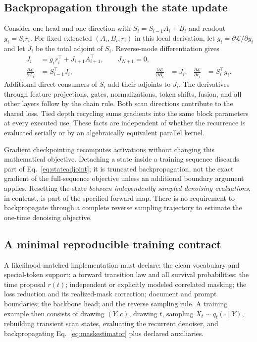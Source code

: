 \documentclass{article}
\theoremstyle{remark}\newtheorem{remark}[theorem]{Remark}
\begin{document}
\subsection{Backpropagation through the state update}
Consider one head and one direction with
$S_i=S_{i-1}A_i+B_i$ and readout $y_i=S_ir_i$.
For fixed extracted $(A_i,B_i,r_i)$ in this local derivation, let $g_i=\partial\mathcal L/\partial y_i$ and let $J_i$ be the total adjoint of $S_i$. Reverse-mode differentiation gives
\begin{align}
 J_i&=g_ir_i^\top+J_{i+1}A_{i+1}^\top,\qquad J_{N+1}=0,\\
 \frac{\partial\mathcal L}{\partial A_i}&=S_{i-1}^\top J_i,
 &\frac{\partial\mathcal L}{\partial B_i}&=J_i,
 &\frac{\partial\mathcal L}{\partial r_i}&=S_i^\top g_i.
 \label{eq:stateadjoint}
\end{align}
Additional direct consumers of $S_i$ add their adjoints to $J_i$. The derivatives through feature projections, gates, normalizations, token shifts, fusion, and all other layers follow by the chain rule. Both scan directions contribute to the shared loss. Tied depth recycling sums gradients into the same block parameters at every executed use. These facts are independent of whether the recurrence is evaluated serially or by an algebraically equivalent parallel kernel.

Gradient checkpointing recomputes activations without changing this mathematical objective. Detaching a state inside a training sequence discards part of Eq.~\eqref{eq:stateadjoint}; it is truncated backpropagation, not the exact gradient of the full-sequence objective unless an additional boundary argument applies. Resetting the state \emph{between independently sampled denoising evaluations}, in contrast, is part of the specified forward map. There is no requirement to backpropagate through a complete reverse sampling trajectory to estimate the one-time denoising objective.

\subsection{A minimal reproducible training contract}
A likelihood-matched implementation must declare: the clean vocabulary and special-token support; a forward transition law and all survival probabilities; the time proposal $r(t)$; independent or explicitly modeled correlated masking; the loss reduction and its realized-mask correction; document and prompt boundaries; the backbone head; and the reverse sampling rule. A training example then consists of drawing $(Y,c)$, drawing $t$, sampling $X_t\sim q_t(\cdot\mid Y)$, rebuilding transient scan states, evaluating the recurrent denoiser, and backpropagating Eq.~\eqref{eq:maskestimator} plus declared auxiliaries.
\end{document}
